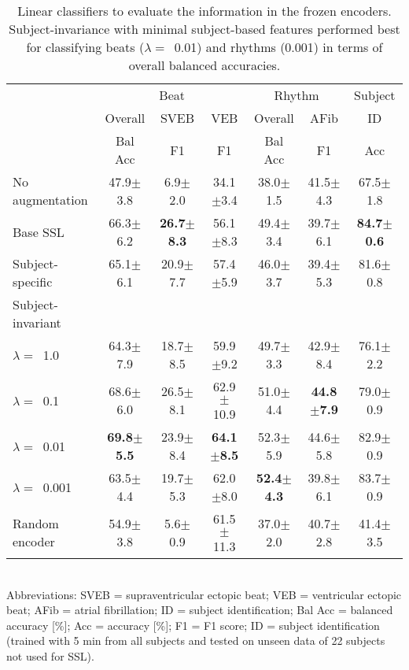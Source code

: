 \documentclass{article}
\newcommand{\std}[1]{{\scriptsize{$\pm$#1}}}
\begin{document}
\begin{table}
  \caption{Linear classifiers to evaluate the information in the frozen
  encoders. Subject-invariance with minimal subject-based features performed
  best for classifying beats ($\lambda=$~0.01) and rhythms (0.001) in terms of overall balanced accuracies.}
  \label{table:ecg:inter}
  \centering
  \small
  \begin{tabular}{lcccccc}
    \toprule
    & \multicolumn{3}{c}{Beat}
    & \multicolumn{2}{c}{Rhythm}
    & Subject \\
    \cmidrule(lr){2-4}
    \cmidrule(lr){5-6}
    \cmidrule(lr){7-7}
    & Overall
    & \multicolumn{1}{c}{SVEB} & \multicolumn{1}{c}{VEB}
    & Overall & AFib
    & ID \\
    & Bal Acc & F1 & F1 & Bal Acc & F1 & Acc \\
    \hline

No augmentation
& 47.9\std{3.8} & 6.9\std{2.0} & 34.1\std{3.4}
& 38.0\std{1.5} & 41.5\std{4.3}
& 67.5\std{1.8} \\

Base SSL
& 66.3\std{6.2} & \textbf{26.7\std{8.3}} & 56.1\std{8.3}
& 49.4\std{3.4} & 39.7\std{6.1}
& \textbf{84.7\std{0.6}} \\

Subject-specific
& 65.1\std{6.1} & 20.9\std{7.7} & 57.4\std{5.9}
& 46.0\std{3.7} & 39.4\std{5.3}
& 81.6\std{0.8} \\

    Subject-invariant \\
\hspace{5pt}$\lambda=$~1.0
& 64.3\std{7.9} & 18.7\std{8.5} & 59.9\std{9.2}
& 49.7\std{3.3} & 42.9\std{8.4}
& 76.1\std{2.2} \\

\hspace{5pt}$\lambda=$~0.1
& 68.6\std{6.0} & 26.5\std{8.1}  & 62.9\std{10.9}
& 51.0\std{4.4} & \textbf{44.8\std{7.9}}
& 79.0\std{0.9}\\

\hspace{5pt}$\lambda=$~0.01
& \textbf{69.8\std{5.5}} & 23.9\std{8.4} & \textbf{64.1\std{8.5}}
& 52.3\std{5.9} & 44.6\std{5.8}
& 82.9\std{0.9} \\

\hspace{5pt}$\lambda=$~0.001
& 63.5\std{4.4} & 19.7\std{5.3} & 62.0\std{8.0}
& \textbf{52.4\std{4.3}} & 39.8\std{6.1}
& 83.7\std{0.9}\\

    \hline
Random encoder
& 54.9\std{3.8} & 5.6\std{0.9} & 61.5\std{11.3}
& 37.0\std{2.0} & 40.7\std{2.8}
    & 41.4\std{3.5} \\
    \bottomrule
  \end{tabular}\\
  \footnotesize{Abbreviations: SVEB = supraventricular ectopic beat; VEB =
  ventricular ectopic beat; AFib = atrial fibrillation; ID = subject
  identification; Bal Acc = balanced accuracy [\%]; Acc = accuracy [\%]; F1 = F1
  score; ID = subject identification (trained with 5 min from all subjects and
  tested on unseen data of 22 subjects not used for SSL).}
\end{table}
 
\end{document}
